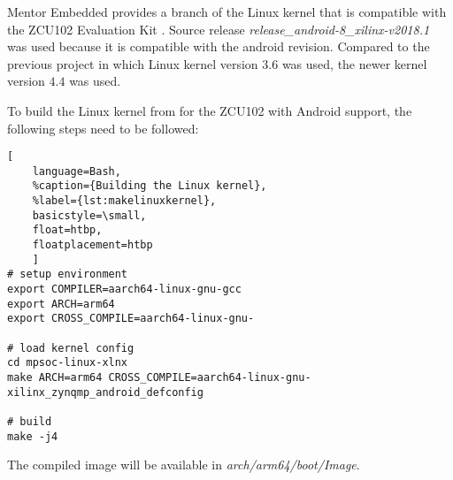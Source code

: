 Mentor Embedded provides a branch of the Linux kernel that is compatible with the ZCU102 Evaluation Kit \cite{linuxkernel}.
Source release \emph{release_android-8_xilinx-v2018.1} was used because it is compatible with the android revision. Compared to the previous project \cite{oldrepo} in which Linux kernel version $3.6$ was used, the newer kernel version $4.4$ was used.

To build the Linux kernel from \cite{linuxkernel} for the ZCU102 with Android support,
the following steps need to be followed:
\begin{lstlisting}[
	language=Bash,
	%caption={Building the Linux kernel},
	%label={lst:makelinuxkernel},
	basicstyle=\small,
	float=htbp,
	floatplacement=htbp
	]
# setup environment
export COMPILER=aarch64-linux-gnu-gcc
export ARCH=arm64
export CROSS_COMPILE=aarch64-linux-gnu-	

# load kernel config
cd mpsoc-linux-xlnx
make ARCH=arm64 CROSS_COMPILE=aarch64-linux-gnu- xilinx_zynqmp_android_defconfig

# build
make -j4
\end{lstlisting}

The compiled image will be available in \emph{arch/arm64/boot/Image}.